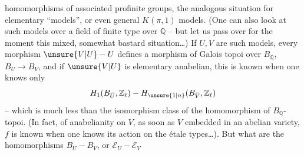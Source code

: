 homomorphisms of associated profinite groups,   the analogous situation for elementary  ``models'', or even general $K(\pi,1)$ models. (One can also look at  such models over a  field  of finite type over $\mathbb Q$ -- but let us pass over for the moment this mixed, somewhat bastard situation\ldots) If $U,V$ are such models, every morphism $\unsure{V|U}-U$ defines a morphism of Galois topoi over $B_{\mathbb Q}$, $B_U\longrightarrow B_V$,  and if $\unsure{V|U}$ is  elementary anabelian, this  is known when one knows only
\[
H_1(B_{\bar U},\mathbb Z_{\ell})-H_{\unsure{1|n}}(B_{\bar V},\mathbb Z_{\ell})
\]
-- which is much less than the isomorphism class of the homomorphism of $B_{\mathbb Q}$-topoi. (In fact,   of anabelianity on $V$, as soon as $V$  embedded in an abelian variety, $f$ is known when one knows its action on the étale types\ldots). But what are the homomorphisms $B_U-B_V$, or $\mathcal E_U-\mathcal E_V$
